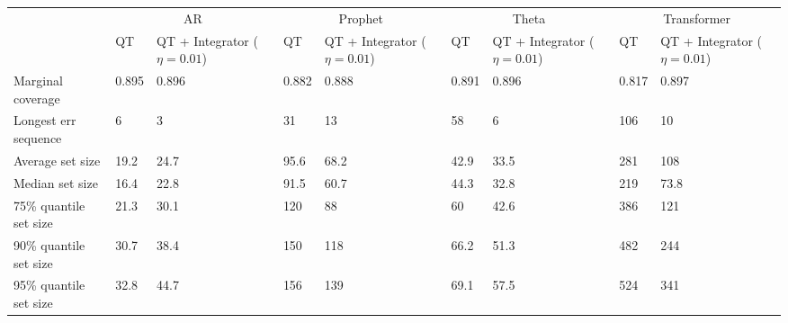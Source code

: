 \begin{tabular}{lllllllll}
\toprule
& \multicolumn{2}{c}{AR}& \multicolumn{2}{c}{Prophet}& \multicolumn{2}{c}{Theta}& \multicolumn{2}{c}{Transformer} \\
& QT & QT + Integrator ($\eta=0.01$) & QT & QT + Integrator ($\eta=0.01$) & QT & QT + Integrator ($\eta=0.01$) & QT & QT + Integrator ($\eta=0.01$) \\
\midrule
Marginal coverage & 0.895 & 0.896 & 0.882 & 0.888 & 0.891 & 0.896 & 0.817 & 0.897 \\
Longest err sequence & 6 & 3 & 31 & 13 & 58 & 6 & 106 & 10 \\
Average set size & 19.2 & 24.7 & 95.6 & 68.2 & 42.9 & 33.5 & 281 & 108 \\
Median set size & 16.4 & 22.8 & 91.5 & 60.7 & 44.3 & 32.8 & 219 & 73.8 \\
75\% quantile set size & 21.3 & 30.1 & 120 & 88 & 60 & 42.6 & 386 & 121 \\
90\% quantile set size & 30.7 & 38.4 & 150 & 118 & 66.2 & 51.3 & 482 & 244 \\
95\% quantile set size & 32.8 & 44.7 & 156 & 139 & 69.1 & 57.5 & 524 & 341 \\
\bottomrule
\end{tabular}
